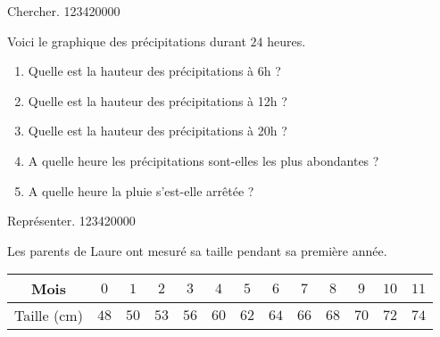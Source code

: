 \begin{pageAD}


\begin{ExoCad}{ Chercher. }{1234}{2}{0}{0}{0}{0}

\begin{minipage}{0.58\linewidth}

Voici le graphique des précipitations durant $24$ heures.
 

\end{minipage} 
\begin{minipage}{0.38\linewidth}

\begin{enumerate}[leftmargin=*]
\item Quelle est la hauteur des précipitations à 6h ? 
\item Quelle est la hauteur des précipitations à 12h ? 
\item Quelle est la hauteur des précipitations à 20h ? 
\item A quelle heure les précipitations sont-elles les plus abondantes ? 
\item A quelle heure la pluie s'est-elle arrêtée ?  
\end{enumerate}


\end{minipage} 
\end{ExoCad} 


\begin{ExoCad}{ Représenter. }{1234}{2}{0}{0}{0}{0}

Les parents de Laure ont mesuré sa taille pendant sa première année.
\begin{center}
\begin{tabular}{|c|c|c|c|c|c|c|c|c|c|c|c|c|}\hline
Mois & $0$ & $1$ & $2$ & $3$ & $4$ & $5$ & $6$ & $7$ & $8$ & $9$ & $10$ & $11$ \\\hline
Taille (cm) & $48$ & $50$ & $53$ & $56$ & $60$ & $62$ & $64$ & $66$ & $68$ &$70$ & $72$ & $74$ \\\hline
\end{tabular}
\end{center}


\end{ExoCad}
\end{pageAD}
